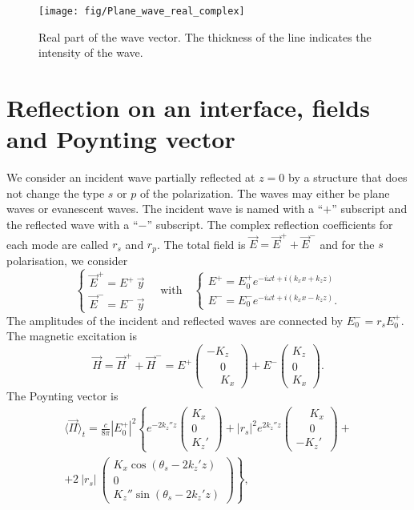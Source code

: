 \begin{figure}[h!]
\texttt{[image: fig/Plane\_wave\_real\_complex]}
\caption{\label{fig:Plane_wave_real_complex}Real part of the wave vector. The thickness of the line indicates the intensity of the wave.}
\end{figure}


\section{Reflection on an interface, fields and Poynting vector}

We consider an incident wave partially reflected at $z=0$ by a structure that does not change the type $s$ or $p$ of the polarization.
The waves may either be plane waves or evanescent waves.
The incident wave is named with a ``$+$'' subscript and the reflected wave with a ``$-$'' subscript.
The complex reflection coefficients for each mode are called $r_s$ and $r_p$.
%
The total field is $\vec E = \vec E^+ + \vec E^-$
and for the $s$ polarisation, we consider
$$
\left\{
\begin{array}{l}
\vec E^+ = E^+\ \vec y \\
\vec E^- = E^-\ \vec y
\end{array}
\right.
\quad\mathrm{with}\quad
\left\{
\begin{array}{l}
E^+ = E_0^+ e^{-i\omega t + i(k_x x + k_z z)}  \\
E^- = E_0^- e^{-i\omega t + i(k_x x - k_z z)}.
\end{array}
\right.
$$
The amplitudes of the incident and reflected waves are connected by $E_0^- = r_s E_0^+$.
The magnetic excitation is 
$$
\vec H = \vec H^+ + \vec H^- = 
E^+ 
\begin{pmatrix}
- K_z \\
\phantom{-} 0 \\
\phantom{-} K_x 
\end{pmatrix}
+
E^-
\begin{pmatrix}
K_z \\
0 \\
K_x 
\end{pmatrix}.
$$
The Poynting vector is
\begin{align*}
\langle \vec{\Pi} \rangle_t = 
\frac{c}{8\pi} |E_0^+|^2 \left\{
e^{-2 k_z'' z} 
\begin{pmatrix}
K_x \\
0 \\
K_z'
\end{pmatrix}
+ 
|r_s|^2
e^{2 k_z'' z}
\begin{pmatrix}
\phantom{-} K_x \\
\phantom{-} 0 \\
-K_z'
\end{pmatrix}
+ \right.\\
\left. +
2\ |r_s|\ 
\begin{pmatrix}
K_x \cos(\theta_{s} - 2 k_z' z)\\
0 \\
K_z'' \sin(\theta_{s} - 2 k_z' z)
\end{pmatrix}
\right\},
\end{align*}
